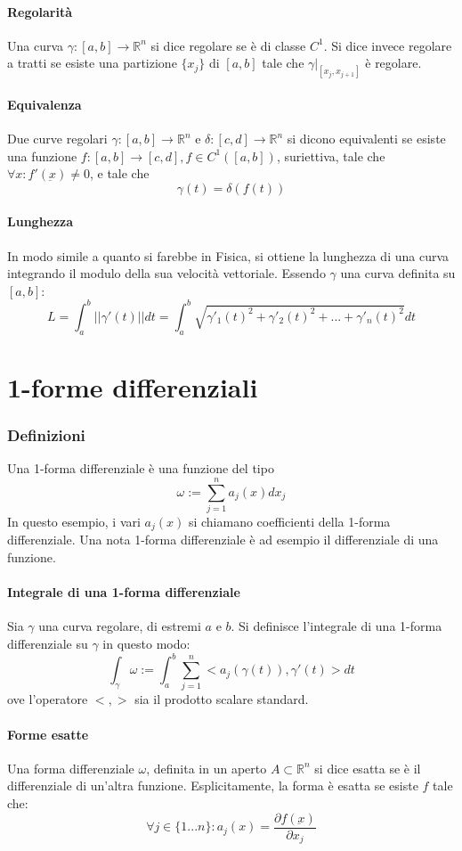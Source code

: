 \documentclass[a4paper,12pt]{article}
\begin{document}
\paragraph{Regolarità}
Una curva $\gamma:[a,b]\rightarrow\mathbb{R}^n$ si dice regolare se è di classe $C^1$. Si dice invece regolare a tratti se esiste una partizione $\{x_j\}$ di $[a,b]$ tale che $\gamma|_{[x_j, x_{j+1}]}$ è regolare.
\paragraph{Equivalenza}
Due curve regolari $\gamma :[a,b]\rightarrow\mathbb{R}^n$ e $\delta :[c,d]\rightarrow\mathbb{R}^n$ si dicono equivalenti se esiste una funzione 
$f:[a,b]\rightarrow[c,d], f \in C^1([a,b])$, suriettiva, tale che $\forall x: f'(\underbar{x}) \neq 0$, e tale che
$$\gamma(t) = \delta(f(t))$$
\paragraph{Lunghezza}
In modo simile a quanto si farebbe in Fisica, si ottiene la lunghezza di una curva integrando il modulo della sua velocità vettoriale. Essendo $\gamma$ una curva definita su $[a, b]$:
$$L= \int_a^b ||\gamma'(t)|| dt = \int_a^b\sqrt{\gamma'_1(t)^2+\gamma'_2(t)^2+...+\gamma'_n(t)^2}dt$$


\section{1-forme differenziali}
\subsubsection{Definizioni}
Una 1-forma differenziale è una funzione del tipo
$$\omega := \sum_{j=1}^n a_j(x)dx_j$$
In questo esempio, i vari $a_j(x)$ si chiamano coefficienti della 1-forma differenziale.
Una nota 1-forma differenziale è ad esempio il differenziale di una funzione.
\paragraph{Integrale di una 1-forma differenziale}
Sia $\gamma$ una curva regolare, di estremi $a$ e $b$.
Si definisce l'integrale di una 1-forma differenziale su $\gamma$ in questo modo:
$$\int_\gamma \omega:=\int_a^b \sum_{j=1}^n <a_j(\gamma(t)), \gamma'(t)> dt$$
ove l'operatore $<,>$ sia il prodotto scalare standard.
\paragraph{Forme esatte}
Una forma differenziale $\omega$, definita in un aperto $A\subset\mathbb{R}^n$ si dice esatta se è il differenziale di un'altra funzione.
Esplicitamente, la forma è esatta se esiste $f$ tale che:
$$\forall j\in\{1 ... n\}: a_j(x) = \frac{\partial f(\underbar{x})}{\partial x_j}$$
\end{document}
